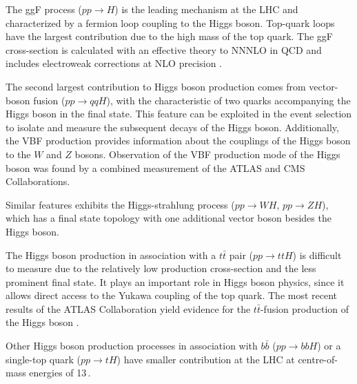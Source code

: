 The ggF process ($pp\rightarrow H$) is the leading mechanism at the LHC and characterized by a fermion loop coupling to the Higgs boson. Top-quark loops have the largest contribution due to the high mass of the top quark. The ggF cross-section is calculated with an effective theory to NNNLO in QCD and includes electroweak corrections at NLO precision \cite{Anastasiou:2016cez}.

The second largest contribution to Higgs boson production comes from vector-boson fusion ($pp\rightarrow qqH$), with the characteristic of two quarks accompanying the Higgs boson in the final state.
This feature can be exploited in the event selection to isolate and measure the subsequent decays of the Higgs boson. Additionally, the VBF production provides information about the couplings of the Higgs boson to the $W$ and $Z$ bosons. Observation of the VBF production mode of the Higgs boson was found by a combined measurement of the ATLAS and CMS Collaborations\cite{Khachatryan:2016vau}.

Similar features exhibits the Higgs-strahlung process ($pp \rightarrow WH$, $pp \rightarrow ZH$), which has a final state topology with one additional vector boson besides the Higgs boson. 

The Higgs boson production in association with a $t\bar{t}$ pair ($pp \rightarrow ttH$) is difficult to measure due to the relatively low production cross-section and the less prominent final state. It plays an important role in Higgs boson physics, since it allows direct access to the Yukawa coupling of the top quark. The most recent results of the ATLAS Collaboration yield evidence for the $t\bar{t}$-fusion production of the Higgs boson \cite{ATLAS-CONF-2017-077}.

Other Higgs boson production processes in association with $b\bar{b}$ ($pp\rightarrow bbH$) or a single-top quark ($pp \rightarrow tH$) have smaller contribution at the LHC at centre-of-mass energies of 13\,\TeV.

